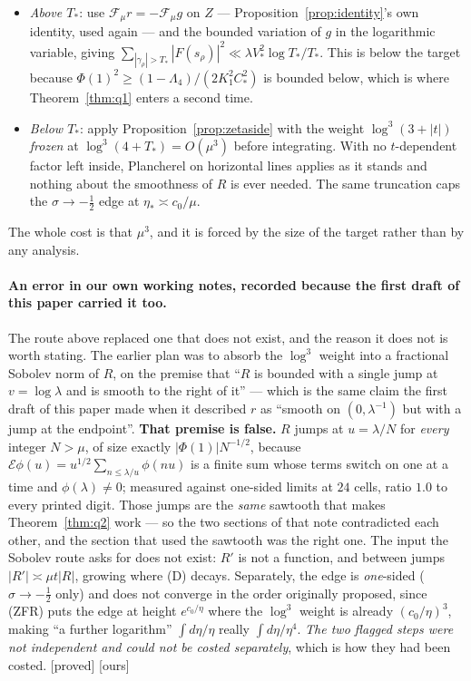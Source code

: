 \documentclass[11pt,a4paper]{article}
\theoremstyle{plain}
\theoremstyle{definition}
\theoremstyle{remark}
\newcommand{\st}[1]{{\normalfont\sffamily\footnotesize[#1]}}
\newcommand{\proved}{\st{proved}}
\newcommand{\ours}{{\normalfont\sffamily\footnotesize[ours]}}
\newcommand{\E}{\mathcal{E}}
\newcommand{\F}{\mathcal{F}}
\begin{document}
\begin{itemize}\itemsep2pt
\item \emph{Above $T_*$}: use $\F_\mu r=-\F_\mu g$ on $Z$ ---
Proposition~\ref{prop:identity}'s own identity, used again --- and the bounded
variation of $g$ in the logarithmic variable, giving
$\sum_{|\gamma_\rho|>T_*}|F(s_\rho)|^2\ll\lambda V_*^2\log T_*/T_*$.  This is
below the target because $\Phi(1)^2\ge(1-\Lambda_4)/(2K_1^2C_*^2)$ is bounded
below, which is where Theorem~\ref{thm:q1} enters a second time.
\item \emph{Below $T_*$}: apply Proposition~\ref{prop:zetaside} with the weight
$\log^3(3+|t|)$ \emph{frozen} at $\log^3(4+T_*)=O(\mu^3)$ before integrating.
With no $t$-dependent factor left inside, Plancherel on horizontal lines applies
as it stands and nothing about the smoothness of $R$ is ever needed.  The same
truncation caps the $\sigma\to-\tfrac12$ edge at $\eta_*\asymp c_0/\mu$.
\end{itemize}

\noindent The whole cost is that $\mu^3$, and it is forced by the size of the
target rather than by any analysis.

\paragraph{An error in our own working notes, recorded because the first draft
of this paper carried it too.}  The route above replaced one that does not
exist, and the reason it does not is worth stating.  The earlier plan was to
absorb the $\log^3$ weight into a fractional Sobolev norm of $R$, on the premise
that ``$R$ is bounded with a single jump at $v=\log\lambda$ and is smooth to the
right of it'' --- which is the same claim the first draft of this paper made
when it described $r$ as ``smooth on $(0,\lambda^{-1})$ but with a jump at the
endpoint''.  \textbf{That premise is false.}  $R$ jumps at $u=\lambda/N$ for
\emph{every} integer $N>\mu$, of size exactly $|\Phi(1)|N^{-1/2}$, because
$\E\phi(u)=u^{1/2}\sum_{n\le\lambda/u}\phi(nu)$ is a finite sum whose terms
switch on one at a time and $\phi(\lambda)\ne0$; measured against one-sided
limits at $24$ cells, ratio $1.0$ to every printed digit.  Those jumps are the
\emph{same} sawtooth that makes Theorem~\ref{thm:q2} work --- so the two
sections of that note contradicted each other, and the section that used the
sawtooth was the right one.  The input the Sobolev route asks for does not
exist: $R'$ is not a function, and between jumps $|R'|\asymp\mu t|R|$, growing
where (D) decays.  Separately, the edge is \emph{one}-sided
($\sigma\to-\tfrac12$ only) and does not converge in the order originally
proposed, since (ZFR) puts the edge at height $e^{c_0/\eta}$ where the $\log^3$
weight is already $(c_0/\eta)^3$, making ``a further logarithm''
$\int d\eta/\eta$ really $\int d\eta/\eta^4$.  \emph{The two flagged steps were
not independent and could not be costed separately}, which is how they had been
costed.  \proved{} \ours
\end{document}
